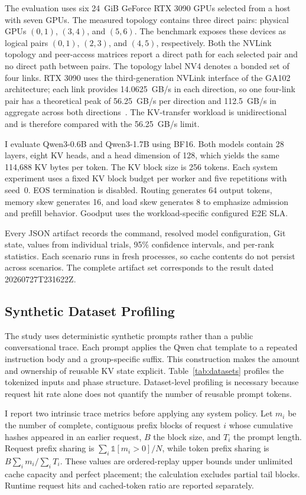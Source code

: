 \documentclass{article}
\begin{document}
The evaluation uses six 24~GiB GeForce RTX 3090 GPUs selected from a host with seven GPUs. The measured topology contains three direct pairs: physical GPUs $(0,1)$, $(3,4)$, and $(5,6)$. The benchmark exposes these devices as logical pairs $(0,1)$, $(2,3)$, and $(4,5)$, respectively. Both the NVLink topology and peer-access matrices report a direct path for each selected pair and no direct path between pairs. The topology label NV4 denotes a bonded set of four links. RTX 3090 uses the third-generation NVLink interface of the GA102 architecture; each link provides 14.0625~GB/s in each direction, so one four-link pair has a theoretical peak of 56.25~GB/s per direction and 112.5~GB/s in aggregate across both directions~\citep{NVIDIAAmpereGA102}. The KV-transfer workload is unidirectional and is therefore compared with the 56.25~GB/s limit.

I evaluate Qwen3-0.6B and Qwen3-1.7B using BF16. Both models contain 28 layers, eight KV heads, and a head dimension of 128, which yields the same 114,688 KV bytes per token. The KV block size is 256 tokens. Each system experiment uses a fixed KV block budget per worker and five repetitions with seed~0. EOS termination is disabled. Routing generates 64 output tokens, memory skew generates 16, and load skew generates 8 to emphasize admission and prefill behavior. Goodput uses the workload-specific configured E2E SLA.

Every JSON artifact records the command, resolved model configuration, Git state, values from individual trials, 95\% confidence intervals, and per-rank statistics. Each scenario runs in fresh processes, so cache contents do not persist across scenarios. The complete artifact set corresponds to the result dated 20260727T231622Z.

\subsection{Synthetic Dataset Profiling}

The study uses deterministic synthetic prompts rather than a public conversational trace. Each prompt applies the Qwen chat template to a repeated instruction body and a group-specific suffix. This construction makes the amount and ownership of reusable KV state explicit. Table~\ref{tab:datasets} profiles the tokenized inputs and phase structure. Dataset-level profiling is necessary because request hit rate alone does not quantify the number of reusable prompt tokens.

I report two intrinsic trace metrics before applying any system policy. Let $m_i$ be the number of complete, contiguous prefix blocks of request $i$ whose cumulative hashes appeared in an earlier request, $B$ the block size, and $T_i$ the prompt length. Request prefix sharing is $\sum_i \mathbb{1}[m_i>0]/N$, while token prefix sharing is $B\sum_i m_i/\sum_i T_i$. These values are ordered-replay upper bounds under unlimited cache capacity and perfect placement; the calculation excludes partial tail blocks. Runtime request hits and cached-token ratio are reported separately.
\end{document}
